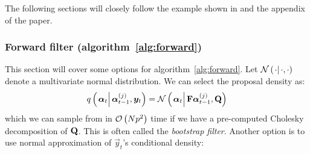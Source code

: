The following sections will closely follow the example shown in \cite{fearnhead10} and the appendix of the paper. 

\subsubsection*{Forward filter (algorithm~\ref{alg:forward})}
This section will cover some options for algorithm~\ref{alg:forward}. Let $\normalC{\cdot}{\cdot}{\cdot}$ denote a multivariate normal distribution. We can select the proposal density as:
\begin{equation}
	\IDC{\vec{\alpha}_t}{\partic{\vec{\alpha}}{t-1}{j}, \vec{y}_t} = %
		\normalC{\vec{\alpha}_t}{\mat{F}\partic{\vec{\alpha}}{t-1}{j}}{\mat{Q}}
\end{equation}%
%
which we can sample from in $\mathcal{O}\left( Np^2\right)$ time if we have a pre-computed Cholesky decomposition of $\mathbf{Q}$. This is often called the \emph{bootstrap filter}. Another option is to use normal approximation of $\vec{y}_t$'s conditional density:

